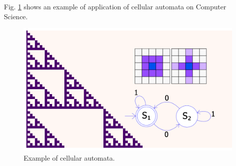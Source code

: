 \documentclass[9pt,a4paper,twoside]{tau-class/tau}
\begin{document}
        Fig. \ref{fig:figure} shows an example of application of cellular automata on Computer Science.
	\begin{figure}[H]
		\centering
		\includegraphics[width=0.75\columnwidth]{figures/theoryOfComputation.png}
		\caption{Example of cellular automata.}
		\label{fig:figure}
	\end{figure}
\end{document}

